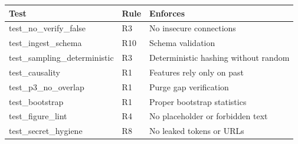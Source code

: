 \begin{tabular}{lll}
\toprule
Test & Rule & Enforces \\
\midrule
test_no_verify_false & R3 & No insecure connections \\
test_ingest_schema & R10 & Schema validation \\
test_sampling_deterministic & R3 & Deterministic hashing without random \\
test_causality & R1 & Features rely only on past \\
test_p3_no_overlap & R1 & Purge gap verification \\
test_bootstrap & R1 & Proper bootstrap statistics \\
test_figure_lint & R4 & No placeholder or forbidden text \\
test_secret_hygiene & R8 & No leaked tokens or URLs \\
\bottomrule
\end{tabular}
